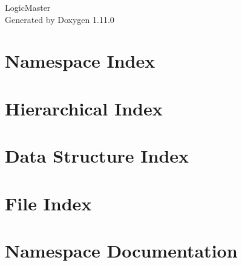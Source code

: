 \documentclass[twoside]{book}
\newcommand{\+}{\discretionary{\mbox{\scriptsize$\hookleftarrow$}}{}{}}
\newcommand{\clearemptydoublepage}{%
    \newpage{\pagestyle{empty}\cleardoublepage}%
  }
\begin{document}
  \raggedbottom
    \hypersetup{pageanchor=false,
                bookmarksnumbered=true,
                pdfencoding=unicode
               }
  \begin{titlepage}
  \vspace*{7cm}
  \begin{center}%
  {\Large Logic\+Master}\\
  \vspace*{1cm}
  {\large Generated by Doxygen 1.11.0}\\
  \end{center}
  \end{titlepage}
  \clearemptydoublepage
  \tableofcontents
  \clearemptydoublepage
  \hypersetup{pageanchor=true}
\chapter{Namespace Index}

\chapter{Hierarchical Index}

\chapter{Data Structure Index}

\chapter{File Index}

\chapter{Namespace Documentation}














\end{document}
